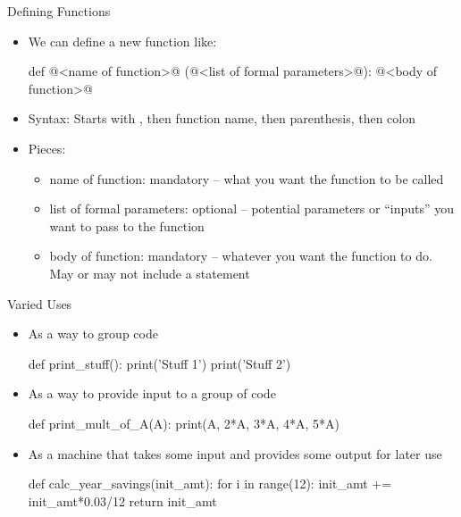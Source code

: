 \documentclass[pdf, aspectratio=169, 12pt]{beamer}
\begin{document}
\begin{frame}[fragile]{Defining Functions}
	\begin{itemize}[<+->]
		\item We can define a new function like:
			{\small
				\begin{pythoncode}[moredelim={[is][\color{Blue}]{@}{@}}]
					def @<name of function>@ (@<list of formal parameters>@):
						@<body of function>@
				\end{pythoncode}
			}
		\item Syntax: Starts with , then function name, then parenthesis, then colon
		\item Pieces:
			\begin{itemize}
				\item name of function: mandatory -- what you want the function to be called
				\item list of formal parameters: optional -- potential parameters or ``inputs'' you want to pass to the function
				\item body of function: mandatory -- whatever you want the function to do. May or may not include a  statement
			\end{itemize}
	\end{itemize}
\end{frame}

\begin{frame}[fragile]{Varied Uses}
	\vspace{5mm}
	\begin{itemize}[<+->]
		\item As a way to group code
			\begin{pythoncode}
				def print_stuff():
					print('Stuff 1')
					print('Stuff 2')
			\end{pythoncode}
		\item As a way to provide input to a group of code
			\begin{pythoncode}
				def print_mult_of_A(A):
					print(A, 2*A, 3*A, 4*A, 5*A)
			\end{pythoncode}
		\item As a machine that takes some input and provides some output for later use
			\begin{pythoncode}
				def calc_year_savings(init_amt):
					for i in range(12):
						init_amt += init_amt*0.03/12
					return init_amt
			\end{pythoncode}
	\end{itemize}
\end{frame}
\end{document}
